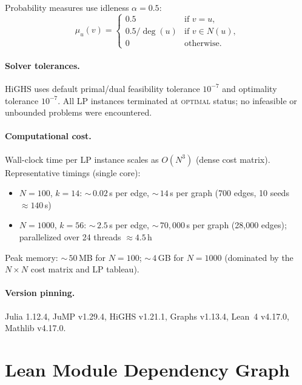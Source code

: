 \documentclass[12pt]{article}
\begin{document}
Probability measures use idleness $\alpha = 0.5$:
\begin{equation}
  \mu_u(v) = \begin{cases}
    0.5 & \text{if } v = u, \\
    0.5/\deg(u) & \text{if } v \in N(u), \\
    0 & \text{otherwise.}
  \end{cases}
  \label{eq:mu}
\end{equation}

\paragraph{Solver tolerances.} HiGHS uses default primal/dual feasibility tolerance
$10^{-7}$ and optimality tolerance $10^{-7}$. All LP instances terminated at \textsc{optimal}
status; no infeasible or unbounded problems were encountered.

\paragraph{Computational cost.} Wall-clock time per LP instance scales as $O(N^3)$ (dense
cost matrix). Representative timings (single core):
\begin{itemize}
  \item $N = 100$, $k = 14$: ${\sim}\,0.02$\,s per edge, ${\sim}\,14$\,s per graph
        (700 edges, 10 seeds $\approx 140$\,s)
  \item $N = 1000$, $k = 56$: ${\sim}\,2.5$\,s per edge, ${\sim}\,70{,}000$\,s per graph
        (28{,}000 edges); parallelized over 24 threads $\approx 4.5$\,h
\end{itemize}
Peak memory: ${\sim}\,50$\,MB for $N = 100$; ${\sim}\,4$\,GB for $N = 1000$ (dominated by
the $N \times N$ cost matrix and LP tableau).

\paragraph{Version pinning.} Julia 1.12.4, JuMP v1.29.4, HiGHS v1.21.1, Graphs v1.13.4,
Lean~4 v4.17.0, Mathlib v4.17.0.

\section{Lean Module Dependency Graph}
\label{app:C}
\end{document}
